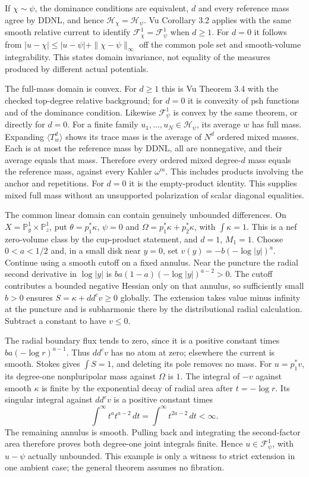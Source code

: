 \documentclass[
  11pt,
]{article}
\begin{document}
If \(\chi\sim\psi\), the dominance conditions are equivalent, \(d\) and
every reference mass agree by DDNL, and hence
\(\mathcal H_\chi=\mathcal H_\psi\). Vu Corollary 3.2 applies with the
same smooth relative current to identify
\(\mathcal F^1_\chi=\mathcal F^1_\psi\) when \(d\geq1\). For \(d=0\) it
follows from \(|u-\chi|\leq|u-\psi|+\|\chi-\psi\|_\infty\) off the
common pole set and smooth-volume integrability. This states domain
invariance, not equality of the measures produced by different actual
potentials.

The full-mass domain is convex. For \(d\geq1\) this is Vu Theorem 3.4
with the checked top-degree relative background; for \(d=0\) it is
convexity of psh functions and of the dominance condition. Likewise
\(\mathcal F^1_\psi\) is convex by the same theorem, or directly for
\(d=0\). For a finite family \(u_1,\ldots,u_N\in\mathcal H_\psi\), its
average \(w\) has full mass. Expanding \(\langle T_w^d\rangle\) shows
its trace mass is the average of \(N^d\) ordered mixed masses. Each is
at most the reference mass by DDNL, all are nonnegative, and their
average equals that mass. Therefore every ordered mixed degree-\(d\)
mass equals the reference mass, against every Kahler \(\omega^m\). This
includes products involving the anchor and repetitions. For \(d=0\) it
is the empty-product identity. This supplies mixed full mass without an
unsupported polarization of scalar diagonal equalities.

The common linear domain can contain genuinely unbounded differences. On
\(X=\mathbb P^1_y\times\mathbb P^1_z\), put \(\theta=p_1^*\kappa\),
\(\psi=0\) and \(\Omega=p_1^*\kappa+p_2^*\kappa\), with
\(\int\kappa=1\). This is a nef zero-volume class by the cup-product
statement, and \(d=1\), \(M_1=1\). Choose \(0<a<1/2\) and, in a small
disk near \(y=0\), set \(v(y)=-b(-\log|y|)^a\). Continue using a smooth
cutoff on a fixed annulus. Near the puncture the radial second
derivative in \(\log|y|\) is \(ba(1-a)(-\log|y|)^{a-2}>0\). The cutoff
contributes a bounded negative Hessian only on that annulus, so
sufficiently small \(b>0\) ensures \(S=\kappa+dd^cv\geq0\) globally. The
extension takes value minus infinity at the puncture and is subharmonic
there by the distributional radial calculation. Subtract a constant to
have \(v\leq0\).

The radial boundary flux tends to zero, since it is a positive constant
times \(ba(-\log r)^{a-1}\). Thus \(dd^cv\) has no atom at zero;
elsewhere the current is smooth. Stokes gives \(\int S=1\), and deleting
its pole removes no mass. For \(u=p_1^*v\), its degree-one nonpluripolar
mass against \(\Omega\) is \(1\). The integral of \(-v\) against smooth
\(\kappa\) is finite by the exponential decay of radial area after
\(t=-\log r\). Its singular integral against \(dd^cv\) is a positive
constant times \[
\int^\infty t^a t^{a-2}\,dt=\int^\infty t^{2a-2}\,dt<\infty.
\] The remaining annulus is smooth. Pulling back and integrating the
second-factor area therefore proves both degree-one joint integrals
finite. Hence \(u\in\mathcal F^1_\psi\), with \(u-\psi\) actually
unbounded. This example is only a witness to strict extension in one
ambient case; the general theorem assumes no fibration.
\end{document}
